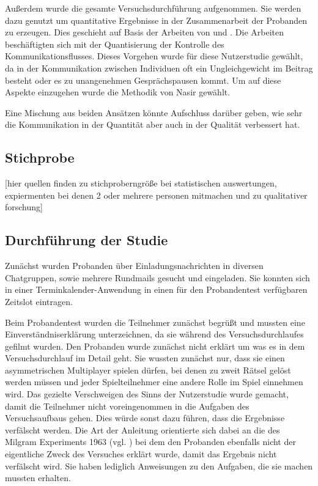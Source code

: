 Außerdem wurde die gesamte Versuchsdurchführung aufgenommen. Sie werden dazu genutzt um quantitative Ergebnisse in der Zusammenarbeit der Probanden zu erzeugen. Dies geschieht auf Basis der Arbeiten von \cite{nasir_cooperative_2013} und \cite{nasir_effect_2015}. Die Arbeiten beschäftigten sich mit der Quantisierung der Kontrolle des Kommunikationsflusses. Dieses Vorgehen wurde für diese Nutzerstudie gewählt, da in der Kommunikation zwischen Individuen oft ein Ungleichgewicht im Beitrag besteht oder es zu unangenehmen Gesprächspausen kommt. Um auf diese Aspekte einzugehen wurde die Methodik von Nasir gewählt.

Eine Mischung aus beiden Ansätzen könnte Aufschluss darüber geben, wie sehr die Kommunikation in der Quantität aber auch in der Qualität verbessert hat.

\subsection{Stichprobe}
[hier quellen finden zu stichproberngröße bei statistischen auswertungen, expiermenten bei denen 2 oder mehrere personen mitmachen und zu qualitativer forschung]

\subsection{Durchführung der Studie}
Zunächst wurden Probanden über Einladungsnachrichten in diversen Chatgruppen, sowie mehrere Rundmails gesucht und eingeladen. Sie konnten sich in einer Terminkalender-Anwendung in einen für den Probandentest verfügbaren Zeitslot eintragen.

Beim Probandentest wurden die Teilnehmer zunächst begrüßt und mussten eine Einverständniserklärung unterzeichnen, da sie während des Versuchsdurchlaufes gefilmt wurden. Den Probanden wurde zunächst nicht erklärt um was es in dem Versuchsdurchlauf im Detail geht. Sie wussten zunächst nur, dass sie einen asymmetrischen Multiplayer spielen dürfen, bei denen zu zweit Rätsel gelöst werden müssen und jeder Spielteilnehmer eine andere Rolle im Spiel einnehmen wird. Das gezielte Verschweigen des Sinns der Nutzerstudie wurde gemacht, damit die Teilnehmer nicht voreingenommen in die Aufgaben des Versuchsaufbaus gehen. Dies würde sonst dazu führen, dass die Ergebnisse verfälscht werden. Die Art der Anleitung orientierte sich dabei an die des Milgram Experiments 1963 (vgl. \cite{milgram_behavioral_1963}) bei dem den Probanden ebenfalls nicht der eigentliche Zweck des Versuches erklärt wurde, damit das Ergebnis nicht verfälscht wird. Sie haben lediglich Anweisungen zu den Aufgaben, die sie machen mussten erhalten. 

